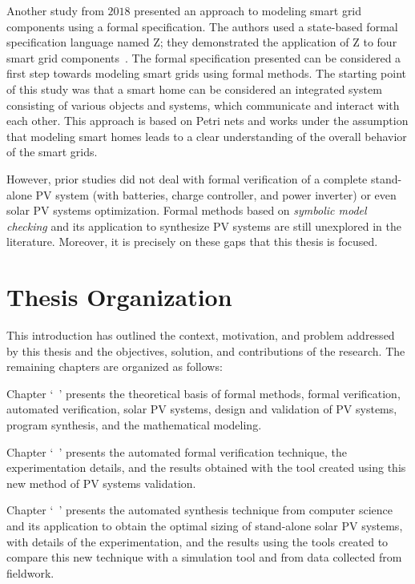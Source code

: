 Another study from $2018$ presented an approach to modeling smart grid components using a formal specification. The authors used a state-based formal specification language named Z; they demonstrated the application of Z to four smart grid components~\cite{Akram2018}. The formal specification presented can be considered a first step towards modeling smart grids using formal methods. The starting point of this study was that a smart home can be considered an integrated system consisting of various objects and systems, which communicate and interact with each other. This approach is based on Petri nets and works under the assumption that modeling smart homes leads to a clear understanding of the overall behavior of the smart grids.

However, prior studies did not deal with formal verification of a complete stand-alone PV system (with batteries, charge controller, and power inverter) or even solar PV systems optimization. Formal methods based on \textit{symbolic model checking} and its application to synthesize PV systems are still unexplored in the literature. Moreover, it is precisely on these gaps that this thesis is focused.

\section{Thesis Organization}

This introduction has outlined the context, motivation, and problem addressed by this thesis and the objectives, solution, and contributions of the research. The remaining chapters are organized as follows:

Chapter `~' presents the theoretical basis of formal methods, formal verification, automated verification, solar PV systems, design and validation of PV systems, program synthesis, and the mathematical modeling. 

Chapter `~' presents the automated formal verification technique, the experimentation details, and the results obtained with the tool created using this new method of PV systems validation. 

Chapter `~' presents the automated synthesis technique from computer science and its application to obtain the optimal sizing of stand-alone solar PV systems, with details of the experimentation, and the results using the tools created to compare this new technique with a  simulation tool and from data collected from fieldwork. 

